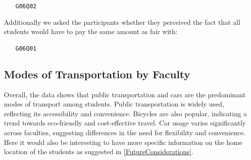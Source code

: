 \begin{multicols}{2}
    {
        
    } \columnbreak {
        
    }
\end{multicols}

\clearpage

\begin{enumerate}
    \item[\texttt{G06Q02}] 
\end{enumerate}

\begin{multicols}{2}
    
    \columnbreak
    
\end{multicols}

Additionally we asked the participants whether they perceived the fact that all students would have to pay the same amount as fair with:

\begin{enumerate}
    \item[\texttt{G06Q01}] 
\end{enumerate}

\begin{multicols}{2}
    
    \columnbreak
    
\end{multicols}

\pagebreak
\subsection{Modes of Transportation by Faculty}

Overall, the data shows that public transportation and cars are the predominant modes of transport among students. Public transportation is widely used, reflecting its accessibility and convenience. Bicycles are also popular, indicating a trend towards eco-friendly and cost-effective travel. Car usage varies significantly across faculties, suggesting differences in the need for flexibility and convenience. Here it would also be interesting to have more specific information on the home location of the students as suggested in \ref{FutureConsiderations}.
 
